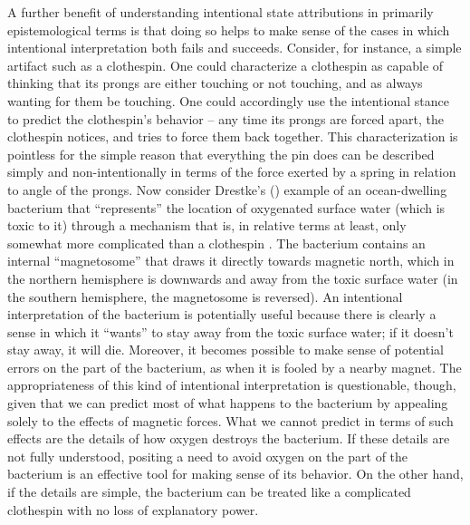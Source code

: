 A further benefit of understanding intentional state attributions in primarily epistemological terms is that doing so helps to make sense of the cases in which intentional interpretation both fails and succeeds. Consider, for instance, a simple artifact such as a clothespin. One could characterize a clothespin as capable of thinking that its prongs are either touching or not touching, and as always wanting for them be touching. One could accordingly use the intentional stance to predict the clothespin's behavior -- any time its prongs are forced apart, the clothespin notices, and tries to force them back together. This characterization is pointless for the simple reason that everything the pin does can be described simply and non-intentionally in terms of the force exerted by a spring in relation to angle of the prongs. Now consider Drestke's (\citeyear{Dretske:1986}) example of an ocean-dwelling bacterium that ``represents'' the location of oxygenated surface water (which is toxic to it) through a mechanism that is, in relative terms at least, only somewhat more complicated than a clothespin \citep[cf.][p. 290-91]{Millikan:1989}. The bacterium contains an internal ``magnetosome'' that draws it directly towards magnetic north, which in the northern hemisphere is downwards and away from the toxic surface water (in the southern hemisphere, the magnetosome is reversed). An intentional interpretation of the bacterium is potentially useful because there is clearly a sense in which it ``wants'' to stay away from the toxic surface water; if it doesn't stay away, it will die. Moreover, it becomes possible to make sense of potential errors on the part of the bacterium, as when it is fooled by a nearby magnet. The appropriateness of this kind of intentional interpretation is questionable, though, given that we can predict most of what happens to the bacterium by appealing solely to the effects of magnetic forces. What we cannot predict in terms of such effects are the details of how oxygen destroys the bacterium. If these details are not fully understood, positing a need to avoid oxygen on the part of the bacterium is an effective tool for making sense of its behavior. On the other hand, if the details are simple, the bacterium can be treated like a complicated clothespin with no loss of explanatory power. 

